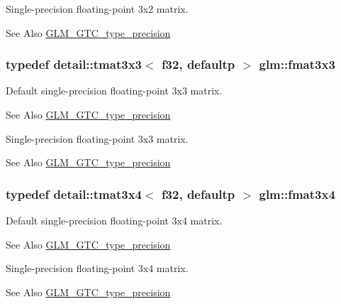 Single-\/precision floating-\/point 3x2 matrix. \begin{DoxySeeAlso}{See Also}
\hyperlink{group__gtc__type__precision}{G\-L\-M\-\_\-\-G\-T\-C\-\_\-type\-\_\-precision} 
\end{DoxySeeAlso}
\hypertarget{group__gtc__type__precision_gafa6841eaaa5ee45de1d892c26b349571}{
\subsubsection[{fmat3x3}]{\setlength{\rightskip}{0pt plus 5cm}typedef detail\-::tmat3x3$<$ f32, defaultp $>$ {\bf glm\-::fmat3x3}}}\label{group__gtc__type__precision_gafa6841eaaa5ee45de1d892c26b349571}
Default single-\/precision floating-\/point 3x3 matrix. \begin{DoxySeeAlso}{See Also}
\hyperlink{group__gtc__type__precision}{G\-L\-M\-\_\-\-G\-T\-C\-\_\-type\-\_\-precision}
\end{DoxySeeAlso}
Single-\/precision floating-\/point 3x3 matrix. \begin{DoxySeeAlso}{See Also}
\hyperlink{group__gtc__type__precision}{G\-L\-M\-\_\-\-G\-T\-C\-\_\-type\-\_\-precision} 
\end{DoxySeeAlso}
\hypertarget{group__gtc__type__precision_ga87084a1f4d6e8dd94f719029840dbafc}{
\subsubsection[{fmat3x4}]{\setlength{\rightskip}{0pt plus 5cm}typedef detail\-::tmat3x4$<$ f32, defaultp $>$ {\bf glm\-::fmat3x4}}}\label{group__gtc__type__precision_ga87084a1f4d6e8dd94f719029840dbafc}
Default single-\/precision floating-\/point 3x4 matrix. \begin{DoxySeeAlso}{See Also}
\hyperlink{group__gtc__type__precision}{G\-L\-M\-\_\-\-G\-T\-C\-\_\-type\-\_\-precision}
\end{DoxySeeAlso}
Single-\/precision floating-\/point 3x4 matrix. \begin{DoxySeeAlso}{See Also}
\hyperlink{group__gtc__type__precision}{G\-L\-M\-\_\-\-G\-T\-C\-\_\-type\-\_\-precision} 
\end{DoxySeeAlso}
